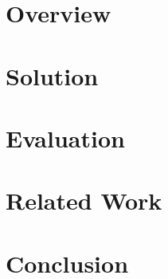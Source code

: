 \documentclass[pageno]{jpaper}
\begin{document}
\section{Overview}
\label{sec:ovf}

\section{Solution}
\label{sec:sol}

\section{Evaluation}
\label{sec:eval}

\section{Related Work}
\label{sec:rw}

\section{Conclusion}
\label{sec:conc}



\end{document}
